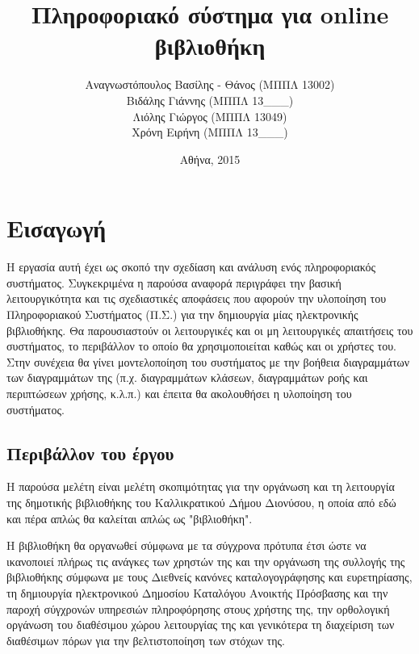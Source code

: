 \documentclass{assignment}
\title{Πληροφοριακό σύστημα για online βιβλιοθήκη}
\date{Αθήνα, 2015}
\author{Αναγνωστόπουλος Βασίλης - Θάνος (ΜΠΠΛ 13002) \\
        Βιδάλης Γιάννης (ΜΠΠΛ 13\_\_\_) \\
        Λιόλης Γιώργος  (ΜΠΠΛ 13049) \\
        Χρόνη Ειρήνη    (ΜΠΠΛ 13\_\_\_)  }
\begin{document}
\maketitle

\setcounter{page}{1} 

\pagestyle{plain}
\tableofcontents
\listoftables
\listoffigures
\renewcommand\listoflistingscaption{Κατάλογος πηγαίου κώδικα}
\renewcommand\listingscaption{Πηγαίος κώδικας}
\listoflistings
\newpage

\setcounter{page}{1} 

\section{Εισαγωγή}

Η εργασία αυτή έχει ως σκοπό την σχεδίαση και ανάλυση ενός πληροφοριακός συστήματος. Συγκεκριμένα η παρούσα αναφορά περιγράφει την βασική λειτουργικότητα και τις σχεδιαστικές αποφάσεις που αφορούν την υλοποίηση του Πληροφοριακού Συστήματος (Π.Σ.) για την δημιουργία μίας ηλεκτρονικής βιβλιοθήκης. Θα παρουσιαστούν οι λειτουργικές και οι μη λειτουργικές απαιτήσεις του συστήματος, το περιβάλλον το οποίο θα χρησιμοποιείται καθώς και οι χρήστες του. Στην συνέχεια θα γίνει μοντελοποίηση του συστήματος με την βοήθεια διαγραμμάτων των διαγραμμάτων της  (π.χ. διαγραμμάτων κλάσεων, διαγραμμάτων ροής και περιπτώσεων χρήσης, κ.λ.π.) και έπειτα θα ακολουθήσει η υλοποίηση του συστήματος.

\subsection{Περιβάλλον του έργου}

Η παρούσα μελέτη είναι μελέτη σκοπιμότητας για την οργάνωση και τη λειτουργία της δημοτικής βιβλιοθήκης του Καλλικρατικού Δήμου Διονύσου, η οποία από εδώ και πέρα απλώς θα καλείται απλώς ως "βιβλιοθήκη". 

Η βιβλιοθήκη θα οργανωθεί σύμφωνα με τα σύγχρονα πρότυπα έτσι ώστε να ικανοποιεί πλήρως τις ανάγκες των χρηστών της και την οργάνωση της συλλογής της βιβλιοθήκης σύμφωνα με τους Διεθνείς κανόνες καταλογογράφησης και ευρετηρίασης, τη δημιουργία ηλεκτρονικού Δημοσίου Καταλόγου Ανοικτής Πρόσβασης και την παροχή σύγχρονών υπηρεσιών πληροφόρησης στους χρήστης της, την ορθολογική οργάνωση του διαθέσιμου χώρου λειτουργίας της και γενικότερα τη διαχείριση των διαθέσιμων πόρων για την βελτιστοποίηση των στόχων της.
\end{document}
